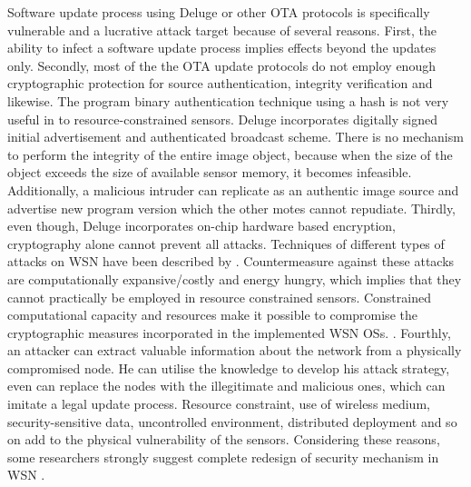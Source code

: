\documentclass[conference]{IEEEtran}
\newcommand{\notedme}[1]{\raisebox{0pt}[0pt][0pt]{\pdfcomment[open=true,color=blue]{#1}}}
\begin{document}
Software update process using Deluge or other OTA protocols is specifically vulnerable and a lucrative attack target because of several reasons.
First, the ability to infect a software update process implies effects beyond the updates only.
Secondly, most of the the OTA update protocols do not employ enough cryptographic protection for source authentication, integrity verification and likewise. 
The program binary authentication technique using a hash is not very useful in to resource-constrained sensors. 
Deluge incorporates digitally signed initial advertisement  and authenticated broadcast scheme. 
There is no mechanism to perform the integrity of the entire image object, because when the size of the object exceeds the size of available sensor memory, it becomes infeasible.
Additionally, a malicious intruder can replicate as an authentic image source and advertise new program version which the other motes cannot repudiate. 
Thirdly, even though,  Deluge incorporates on-chip hardware based encryption, cryptography alone cannot prevent all attacks. %
Techniques of different types of attacks  on WSN have been described by \cite{DBLP:journals/corr/abs-1301-3022}.
Countermeasure  against these attacks are computationally expansive/costly and energy hungry, which implies that they cannot practically be employed in resource constrained sensors. 
Constrained computational capacity and resources make it possible to compromise the cryptographic measures incorporated in the implemented WSN OSs. \cite{aes2011}.  %
Fourthly, an attacker can extract valuable information about the network from a physically compromised node.
He can utilise the knowledge to develop his attack strategy, even can replace the nodes with the illegitimate and malicious ones, which can imitate a legal update process. %
Resource constraint, use of wireless medium, security-sensitive data, uncontrolled environment, distributed deployment and so on add to the physical vulnerability of the sensors.
Considering these reasons, some researchers strongly suggest complete redesign of security mechanism in WSN \cite{quing09}.
\end{document}

